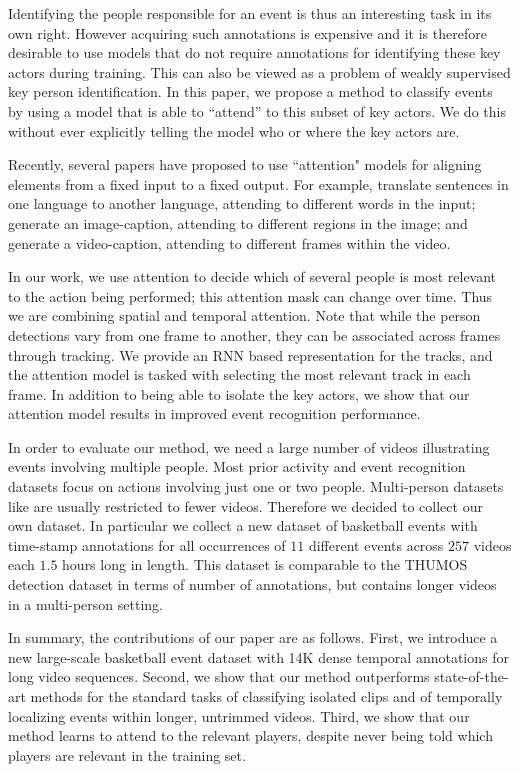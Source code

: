 Identifying the people responsible for an event is thus an interesting task in its
own right.  However acquiring such annotations is expensive and it is therefore
desirable to use models that do not require
annotations for identifying these key actors during training. This can
also be viewed as a problem of weakly supervised key person identification. In
this paper, we propose a method  to classify events by using a model that is
able to ``attend'' to this subset of key actors.  We  do this without ever
explicitly telling the model who or where the key actors are.

Recently, several papers have proposed to use ``attention" models for aligning
elements from a fixed input to a fixed output.  For example,
\cite{Bahdnau_arxiv14} translate sentences in one language to another language,
attending to different words in the input; \cite{Xu_arxiv15} generate an image-caption,
attending to different regions in the image; and
\cite{Yao_arxiv15} generate a video-caption, attending to different
frames within the video.


In our work, we use attention to decide which of several people is most
relevant to the action being performed; this attention mask can change over
time. Thus we are combining spatial and temporal attention.  Note that while
the person detections vary from one frame to another, they can be associated
across frames through tracking. We provide an RNN based representation for the
tracks, and the attention model is tasked with selecting the most relevant
track in each frame. In addition to being able to isolate the key actors,
we show that our attention model results in improved event recognition
performance.

In order to evaluate our method, we need a large number of videos illustrating
events involving multiple people. Most prior activity and event
recognition datasets focus on actions involving just one or two people.
Multi-person datasets like \cite{Ryoo_ICCV09,VIRAT,Choi_ICCV09} are usually restricted to fewer videos.
Therefore we decided to collect our own dataset.
In particular we collect a new dataset of basketball events with time-stamp annotations for
all occurrences of $11$ different events across $257$ videos each $1.5$ hours
long in length.  This dataset is comparable to the THUMOS \cite{THUMOS}
detection dataset in terms of number of annotations, but contains longer videos
in a multi-person setting.

In summary, the contributions of our paper are as follows.  First, we
introduce a new  large-scale basketball event dataset with 14K dense temporal
annotations for long video sequences.  Second, we show that our method
outperforms state-of-the-art methods for the standard tasks of classifying
isolated clips and of temporally localizing events within longer, untrimmed
videos.  Third, we show that our method learns to attend to the relevant
players, despite never being told which players are relevant in the training
set.
